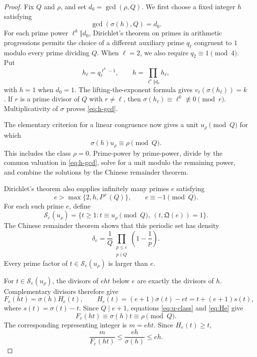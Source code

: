 \documentclass[11pt]{article}
\theoremstyle{remark}
\newcommand{\1}{\mathbf 1}
\begin{document}
\begin{proof}
Fix $Q$ and $\rho$, and set $d_0=\gcd(\rho,Q)$.  We first choose a fixed
integer $h$ satisfying
\begin{equation}\label{eq:h-gcd}
 \gcd(\sigma(h),Q)=d_0.
\end{equation}
For each prime power $\ell^k\Vert d_0$, Dirichlet's theorem on primes in
arithmetic progressions permits the choice of a different auxiliary prime
$q_\ell$ congruent to $1$ modulo every prime dividing $Q$.  When $\ell=2$,
we also require $q_2\equiv1\pmod4$.  Put
\[
 h_\ell=q_\ell^{\ell^k-1},\qquad
 h=\prod_{\ell^k\Vert d_0}h_\ell,
\]
with $h=1$ when $d_0=1$.  The lifting-the-exponent formula gives
$v_\ell(\sigma(h_\ell))=k$.  If $r$ is a prime divisor of $Q$ with $r\ne\ell$, then
$\sigma(h_\ell)\equiv\ell^k\not\equiv0\pmod r$.  Multiplicativity of
$\sigma$ proves \eqref{eq:h-gcd}.

The elementary criterion for a linear congruence now gives a unit
$u_\rho\pmod Q$ for which
\begin{equation}\label{eq:u-class}
 \sigma(h)u_\rho\equiv\rho\pmod Q.
\end{equation}
This includes the class $\rho=0$.  Prime-power by prime-power, divide by the
common valuation in \eqref{eq:h-gcd}, solve for a unit modulo the remaining
power, and combine the solutions by the Chinese remainder theorem.

Dirichlet's theorem also supplies infinitely many primes $e$ satisfying
\[
 e>\max\{2,h,P^+(Q)\},\qquad e\equiv-1\pmod Q.
\]
For each such prime $e$, define
\[
 \mathcal S_e(u_\rho)=\{t\geq1:t\equiv u_\rho\pmod Q,\
 (t,\mathfrak Q(e))=1\}.
\]
The Chinese remainder theorem shows that this periodic set has density
\begin{equation}\label{eq:delta-e}
 \delta_e=\frac1Q
 \prod_{\substack{p\leq e\\p\nmid Q}}\left(1-\frac1p\right).
\end{equation}
Every prime factor of $t\in\mathcal S_e(u_\rho)$ is larger than $e$.

For $t\in\mathcal S_e(u_\rho)$, the divisors of $eht$ below $e$ are exactly
the divisors of $h$.  Complementary divisors therefore give
\begin{equation}\label{eq:He}
 F_e(ht)=\sigma(h)H_e(t),
 \qquad H_e(t)=(e+1)\sigma(t)-et=t+(e+1)s(t),
\end{equation}
where $s(t)=\sigma(t)-t$.  Since $Q\mid e+1$, equations
\eqref{eq:u-class} and \eqref{eq:He} give
\[
 F_e(ht)\equiv\sigma(h)t\equiv\rho\pmod Q.
\]
The corresponding representing integer is $m=eht$.  Since $H_e(t)\geq t$,
\begin{equation}\label{eq:representing-ratio}
 \frac{m}{F_e(ht)}\leq\frac{eh}{\sigma(h)}\leq eh.
\end{equation}


\end{proof}
\end{document}
